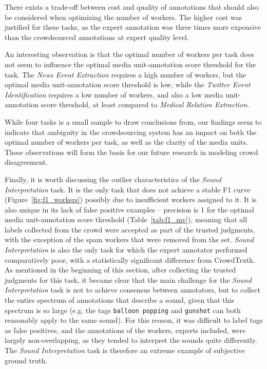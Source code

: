 There exists a trade-off between cost and quality of annotations that should also be considered when optimizing the number of workers.  The higher cost was justified for these tasks, as the expert annotation was three times more expensive than the crowdsourced annotations at expert quality level.

An interesting observation is that the optimal number of workers per task does not seem to influence the optimal media unit-annotation score threshold for the task.  The \textit{News Event Extraction} requires a high number of workers, but the optimal media unit-annotation score threshold is low, while the \textit{Twitter Event Identification} requires a low number of workers, and also a low media unit-annotation score threshold, at least compared to \textit{Medical Relation Extraction}. 

While four tasks is a small sample to draw conclusions from, our findings seem to indicate that ambiguity in the crowdsourcing system has an impact on both the optimal number of workers per task, as well as the clarity of the media units.  These observations will form the basis for our future research in modeling crowd disagreement.

Finally, it is worth discussing the outlier characteristics of the \textit{Sound Interpretation} task. It is the only task that does not achieve a stable F1 curve (Figure~\ref{fig:f1_workers}) possibly due to insufficient workers assigned to it. It is also unique in its lack of false positive examples -- precision is 1 for the optimal media unit-annotation score threshold (Table~\ref{tab:f1_mv}), meaning that all labels collected from the crowd were accepted as part of the trusted judgments, with the exception of the spam workers that were removed from the set.  \textit{Sound Interpretation} is also the only task for which the expert annotator performed comparatively poor, with a statistically significant difference from CrowdTruth. As mentioned in the beginning of this section, after collecting the trusted judgments for this task, it became clear that the main challenge for the \textit{Sound Interpretation} task is not to achieve consensus between annotators, but to collect the entire spectrum of annotations that describe a sound, given that this spectrum is so large (e.g. the tags \texttt{balloon popping} and \texttt{gunshot} can both reasonably apply to the same sound). For this reason, it was difficult to label tags as false positives, and the annotations of the workers, experts included, were largely non-overlapping, as they tended to interpret the sounds quite differently.  The \textit{Sound Interpretation} task is therefore an extreme example of subjective ground truth. \\


